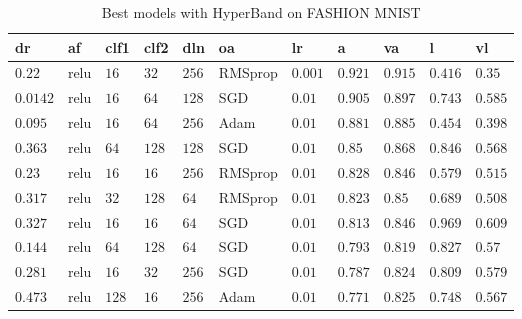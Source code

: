 \begin{table}[htbp]\scriptsize
\begin{tabular}{|p{}p{}p{}p{}p{}p{}p{}p{}p{}p{}p{}|}\hline
dr & af & clf1 & clf2 & dln & oa & lr & a & va & l & vl \\ \hline
$0.22$ & relu & $16$ & $32$ & $256$ & RMSprop & $0.001$ & $0.921$ & $0.915$ & $0.416$ & $0.35$ \\
$0.0142$ & relu & $16$ & $64$ & $128$ & SGD & $0.01$ & $0.905$ & $0.897$ & $0.743$ & $0.585$ \\
$0.095$ & relu & $16$ & $64$ & $256$ & Adam & $0.01$ & $0.881$ & $0.885$ & $0.454$ & $0.398$ \\
$0.363$ & relu & $64$ & $128$ & $128$ & SGD & $0.01$ & $0.85$ & $0.868$ & $0.846$ & $0.568$ \\
$0.23$ & relu & $16$ & $16$ & $256$ & RMSprop & $0.01$ & $0.828$ & $0.846$ & $0.579$ & $0.515$ \\
$0.317$ & relu & $32$ & $128$ & $64$ & RMSprop & $0.01$ & $0.823$ & $0.85$ & $0.689$ & $0.508$ \\
$0.327$ & relu & $16$ & $16$ & $64$ & SGD & $0.01$ & $0.813$ & $0.846$ & $0.969$ & $0.609$ \\
$0.144$ & relu & $64$ & $128$ & $64$ & SGD & $0.01$ & $0.793$ & $0.819$ & $0.827$ & $0.57$ \\
$0.281$ & relu & $16$ & $32$ & $256$ & SGD & $0.01$ & $0.787$ & $0.824$ & $0.809$ & $0.579$ \\
$0.473$ & relu & $128$ & $16$ & $256$ & Adam & $0.01$ & $0.771$ & $0.825$ & $0.748$ & $0.567$ \\ \hline
\end{tabular}\vspace{0.1cm}
	\caption{Best models with HyperBand on FASHION MNIST}
	\label{tab:hyperband_params}
\end{table}
